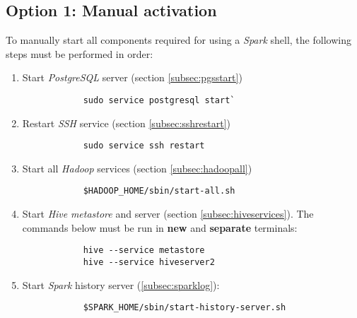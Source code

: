 \documentclass{article}
\begin{document}
    \subsection{Option 1: Manual activation}
    To manually start all components required for using a \emph{Spark} shell, the following steps
    must be performed in order:
    \begin{enumerate}
        \item Start \emph{PostgreSQL} server (section \ref{subsec:pgsstart})
        \begin{verbatim}
            sudo service postgresql start`
        \end{verbatim}

        \item Restart \emph{SSH} service (section \ref{subsec:sshrestart})
        \begin{verbatim}
            sudo service ssh restart
        \end{verbatim}

        \item Start all \emph{Hadoop} services (section \ref{subsec:hadoopall})
        \begin{verbatim}
            $HADOOP_HOME/sbin/start-all.sh
        \end{verbatim}

        \item Start \emph{Hive} \emph{metastore} and server (section \ref{subsec:hiveservices}).
        The commands below must be run in \textbf{new} and \textbf{separate} terminals:
        \begin{verbatim}
            hive --service metastore
            hive --service hiveserver2
        \end{verbatim}

        \item Start \emph{Spark} history server (\ref{subsec:sparklog}):
        \begin{verbatim}
            $SPARK_HOME/sbin/start-history-server.sh
        \end{verbatim}
    \end{enumerate}
\end{document}
